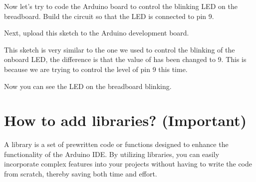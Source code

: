 \documentclass[a4paper,11pt,english]{sphinxmanual}
\let\sphinxpxdimen\pdfpxdimen\else\newdimen\sphinxpxdimen
\begin{document}
\sphinxAtStartPar
Now let’s try to code the Arduino board to control the blinking LED on the breadboard. Build the circuit so that the LED is connected to pin 9.

\noindent{\hspace*{\fill}\sphinxincludegraphics[width=400\sphinxpxdimen]{{Bulid_Circuit8}.png}\hspace*{\fill}}

\sphinxAtStartPar
Next, upload this sketch to the Arduino development board.

\begin{sphinxVerbatim}[commandchars=\\\{\}]


\end{sphinxVerbatim}

\sphinxAtStartPar
This sketch is very similar to the one we used to control the blinking of the on\sphinxhyphen{}board LED, the difference is that the value of  has been changed to 9.
This is because we are trying to control the level of pin 9 this time.

\sphinxAtStartPar
Now you can see the LED on the breadboard blinking.

\sphinxstepscope


\section{How to add libraries? (Important)}
\label{\detokenize{Get_Started_with_Arduino/How_to_add_Libraries:how-to-add-libraries-important}}\label{\detokenize{Get_Started_with_Arduino/How_to_add_Libraries:add-libraries}}\label{\detokenize{Get_Started_with_Arduino/How_to_add_Libraries::doc}}
\sphinxAtStartPar
A library is a set of pre\sphinxhyphen{}written code or functions designed to enhance the functionality of the Arduino IDE. By utilizing libraries, you can easily incorporate complex features into your projects without having to write the code from scratch, thereby saving both time and effort.
\end{document}
